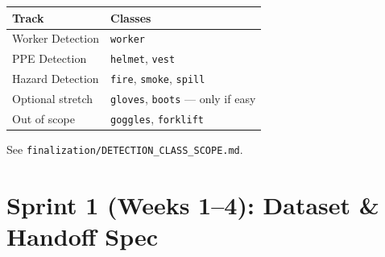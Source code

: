 \documentclass[12pt,a4paper]{article}
\begin{document}
\begin{center}
\begin{tabular}{ll}
\toprule
\textbf{Track} & \textbf{Classes} \\
\midrule
Worker Detection & \texttt{worker} \\
PPE Detection & \texttt{helmet}, \texttt{vest} \\
Hazard Detection & \texttt{fire}, \texttt{smoke}, \texttt{spill} \\
\midrule
Optional stretch & \texttt{gloves}, \texttt{boots} --- only if easy \\
Out of scope & \texttt{goggles}, \texttt{forklift} \\
\bottomrule
\end{tabular}
\end{center}

See \texttt{finalization/DETECTION\_CLASS\_SCOPE.md}.

\section{Sprint 1 (Weeks 1--4): Dataset \& Handoff Spec}
\end{document}
